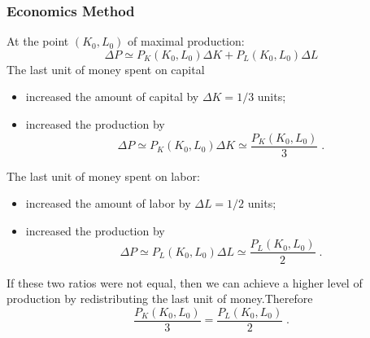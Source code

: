 \begin{frame}
  \frametitle{Economics Method}

  At the point $(K_0,L_0)$ of maximal production:
$$\Delta P \simeq P_K(K_0,L_0) \Delta K + P_L(K_0,L_0) \Delta L$$
%
\pause The last unit of money spent on capital
\begin{itemize}
  \item \pause increased the amount of capital by $\Delta K = 1/3$ units;
  \item \pause increased the production by
%
$$\Delta P \simeq P_K(K_0,L_0) \Delta K \simeq \frac{P_K(K_0,L_0)}{3}\; .$$
\end{itemize}

\pause The last unit of money spent on labor:
\begin{itemize}
  \item \pause increased the amount of labor by $\Delta L = 1/2$ units;
  \item \pause increased the production by
%
$$\Delta P \simeq P_L(K_0,L_0) \Delta L \simeq \frac{P_L(K_0,L_0)}{2}\; .$$
%
\end{itemize}

\pause If these two ratios were not equal, then \pause we can achieve a higher level of production by redistributing the last unit of money.\pause Therefore \pause
%
$$\frac{P_K(K_0,L_0)}{3} = \frac{P_L(K_0,L_0)}{2}\;  .$$
\end{frame}